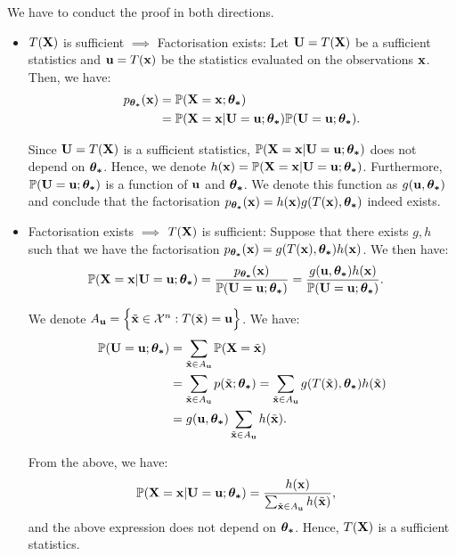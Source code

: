 \begin{proof*}
    We have to conduct the proof in both directions.
    \begin{itemize}
        \item $T({\bf X})$ is sufficient $\implies$ Factorisation exists:
        Let ${\bf U}=T({\bf X})$ be a sufficient statistics and ${\bf u} = T({\bf x})$ be the statistics evaluated on the observations ${\bf x}$. Then, we have:
        \begin{align*}
            p_{\boldsymbol{\theta_*}}({\bf x}) &= \mathbb{P}({\bf X}={\bf x}; \boldsymbol{\theta_*}) \\ 
                &= \mathbb{P}({\bf X}={\bf x} | {\bf U}={\bf u}; \boldsymbol{\theta_*}) \mathbb{P}({\bf U}={\bf u};\boldsymbol{\theta_*}).
        \end{align*} 

        \noindent Since ${\bf U}=T({\bf X})$ is a sufficient statistics, $\mathbb{P}({\bf X}={\bf x}|{\bf U}={\bf u};\boldsymbol{\theta_*})$ does not depend on $\boldsymbol{\theta_*}$. Hence, we denote $h({\bf x}) = \mathbb{P}({\bf X}={\bf x}|{\bf U}={\bf u};\boldsymbol{\theta_*})$. Furthermore, $\mathbb{P}({\bf U}={\bf u};\boldsymbol{\theta_*})$ is a function of ${\bf u}$ and $\boldsymbol{\theta_*}$. We denote this function as $g({\bf u}, \boldsymbol{\theta_*})$ and conclude that the factorisation $p_{\boldsymbol{\theta_*}}({\bf x})=h({\bf x})g(T({\bf x}),\boldsymbol{\theta_*})$ indeed exists. 

        \item Factorisation exists $\implies$ $T({\bf X})$ is sufficient: Suppose that there exists $g, h$ such that we have the factorisation $p_{\boldsymbol{\theta_*}}({\bf x})=g(T({\bf x}), \boldsymbol{\theta_*})h({\bf x})$. We then have:
        \begin{align*}
            \mathbb{P}({\bf X} = {\bf x}|{\bf U} = {\bf u};\boldsymbol{\theta_*}) &=  \frac{p_{\boldsymbol{\theta_*}}({\bf x})}{\mathbb{P}({\bf U}={\bf u};\boldsymbol{\theta_*})} = \frac{g({\bf u}, \boldsymbol{\theta_*})h({\bf x})}{\mathbb{P}({\bf U}={\bf u};\boldsymbol{\theta_*})}.
        \end{align*} 

        \noindent We denote $A_{\bf u} = \Big\{ \tilde{{\bf x}} \in \mathcal{X}^n : T(\tilde{{\bf x}}) = {\bf u} \Big\}$. We have:
        \begin{align*}
            \mathbb{P}({\bf U} = {\bf u};\boldsymbol{\theta_*}) &= \sum_{\tilde {{\bf x}} \in A_{\bf u}} \mathbb{P}({\bf X} = \tilde{{\bf x}}) \\ 
                &= \sum_{\tilde{{\bf x}}\in A_{\bf u}} p(\tilde{{\bf x}};\boldsymbol{\theta_*}) = \sum_{\tilde{{\bf x}}\in A_{\bf u}} g(T(\tilde{{\bf x}}), \boldsymbol{\theta_*})h(\tilde{{\bf x}}) \\ 
                &= g({\bf u}, \boldsymbol{\theta_*}) \sum_{\tilde{{\bf x}}\in A_{\bf u}} h(\tilde{{\bf x}}).
        \end{align*} 

        \noindent From the above, we have:
        \begin{align*}
            \mathbb{P}({\bf X}={\bf x}|{\bf U}={\bf u};\boldsymbol{\theta_*}) &= \frac{h({\bf x})}{\sum_{\tilde{{\bf x}}\in A_{\bf u}} h(\tilde{{\bf x}})},
        \end{align*} 
        \noindent and the above expression does not depend on $\boldsymbol{\theta_*}$. Hence, $T({\bf X})$ is a sufficient statistics.
    \end{itemize}
\end{proof*}

